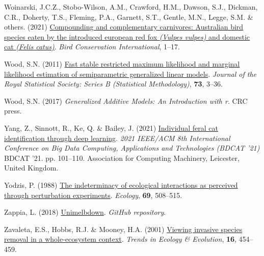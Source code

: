 \documentclass[11pt,a4paper,titlepage,twoside,openright]{style/unimelbthesis}
\newenvironment{CSLReferences}%
  {}%
  {\par}
\begin{document}
\begin{mainmatter}
\begin{CSLReferences}{1}{0}
\leavevmode{}%
Woinarski, J.C.Z., Stobo-Wilson, A.M., Crawford, H.M., Dawson, S.J., Dickman, C.R., Doherty, T.S., Fleming, P.A., Garnett, S.T., Gentle, M.N., Legge, S.M. \& others. (2021) \href{https://doi.org/10.1017/S0959270921000460}{Compounding and complementary carnivores: {A}ustralian bird species eaten by the introduced european red fox \emph{({Vulpes vulpes})} and domestic cat \emph{({Felis catus})}}. \emph{Bird Conservation International}, 1--17.

\leavevmode{}%
Wood, S.N. (2011) \href{\%20https://doi.org/10.1111/j.1467-9868.2010.00749.x}{Fast stable restricted maximum likelihood and marginal likelihood estimation of semiparametric generalized linear models}. \emph{Journal of the Royal Statistical Society: Series B (Statistical Methodology)}, \textbf{73}, 3--36.

\leavevmode{}%
Wood, S.N. (2017) \emph{Generalized Additive Models: An Introduction with r}. CRC press.

\leavevmode{}%
Yang, Z., Sinnott, R., Ke, Q. \& Bailey, J. (2021) \href{https://doi.org/10.1145/3492324.3494168}{Individual feral cat identification through deep learning}. \emph{{2021 IEEE/ACM 8th International Conference on Big Data Computing, Applications and Technologies (BDCAT '21)}} BDCAT '21. pp. 101--110. Association for Computing Machinery, Leicester, United Kingdom.

\leavevmode{}%
Yodzis, P. (1988) \href{https://doi.org/10.2307/1940449}{The indeterminacy of ecological interactions as perceived through perturbation experiments}. \emph{Ecology}, \textbf{69}, 508--515.

\leavevmode{}%
Zappia, L. (2018) \href{https://github.com/lazappi/unimelbdown}{Unimelbdown}. \emph{GitHub repository}.

\leavevmode{}%
Zavaleta, E.S., Hobbs, R.J. \& Mooney, H.A. (2001) \href{https://doi.org/10.1016/S0169-5347(01)02194-2}{Viewing invasive species removal in a whole-ecosystem context}. \emph{Trends in Ecology \& Evolution}, \textbf{16}, 454--459.

\end{CSLReferences}
\appendix

\setlength{\parindent}{0in}
\setlength{\leftskip}{0in}
\setlength{\parskip}{8pt}


\end{mainmatter}
\end{document}
